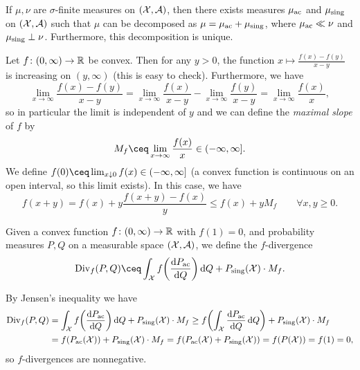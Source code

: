 \begin{theorem}[Lebesgue]
	If $\mu, \nu$ are $\sigma$-finite measures on $(\mathcal X, \mathcal A)$, then there exists measures $\mu_\mathrm{ac}$ and $\mu_\mathrm{sing}$ on $(\mathcal X, \mathcal A)$ such that $\mu$ can be decomposed as $\mu = \mu_\mathrm{ac} + \mu_{\mathrm{sing}}$, where $\mu_\mathrm{ac} \ll \nu$ and $\mu_\mathrm{sing} \perp \nu$. Furthermore, this decomposition is unique. 
\end{theorem}

Let $f \colon (0, \infty) \to \mathbb R$ be convex. Then for any $y > 0$, the function $x \mapsto \frac{f(x) - f(y)}{x - y}$ is increasing on $(y, \infty)$ (this is easy to check). Furthermore, we have
\[
\lim_{x \to \infty} \frac{f(x) - f(y)}{x - y} = \lim_{x \to \infty} \frac{f(x)}{x - y} - \lim_{x \to \infty} \frac{f(y)}{x - y} = \lim_{x \to \infty} \frac{f(x)}{x}, 
\]
so in particular the limit is independent of $y$ and we can define the \emph{maximal slope} of $f$ by
\[
M_f \ceq \lim_{x\to\infty} \frac{f(x)}{x} \in (-\infty, \infty].
\]
We define $f(0) \ceq \lim_{x \downarrow 0} f(x) \in (-\infty, \infty]$ (a convex function is continuous on an open interval, so this limit exists). In this case, we have
\[
f(x + y) = f(x) + y \frac{f(x+y) - f(x)}{y} \leq f(x) + y M_f \qquad\forall x, y \geq 0. 
\]

\begin{definition}
	Given a convex function $f \colon (0, \infty) \to \mathbb R$ with $f(1) = 0$, and probability measures $P, Q$ on a measurable space $(\mathcal X, \mathcal A)$, we define the $f$-divergence 
	\[
	\Div_f(P, Q) \ceq \int_\XX f\qty(\dv{P_\Rm{ac}}{Q}) \dd{Q} + P_\Rm{sing}(\XX) \cdot M_f. 
	\]
\end{definition}

By Jensen's inequality we have
\begin{align*}
	\operatorname{Div}_f(P, Q) &=  \int_\mathcal X f\qty(\dv{P_\mathrm{ac}}{Q}) \dd{Q} + P_\mathrm{sing}(\mathcal X) \cdot M_f \geq f\qty(\int_\mathcal X \dv{P_\mathrm{ac}}{Q} \dd{Q}) + P_\mathrm{sing}(\mathcal X) \cdot M_f \\
	&= f(P_\mathrm{ac}(\mathcal X)) + P_\mathrm{sing}(\mathcal X) \cdot M_f = f(P_\mathrm{ac}(\mathcal X) + P_\mathrm{sing}(\mathcal X)) = f(P(\mathcal X)) = f(1) = 0, 
\end{align*}
so $f$-divergences are nonnegative. 

